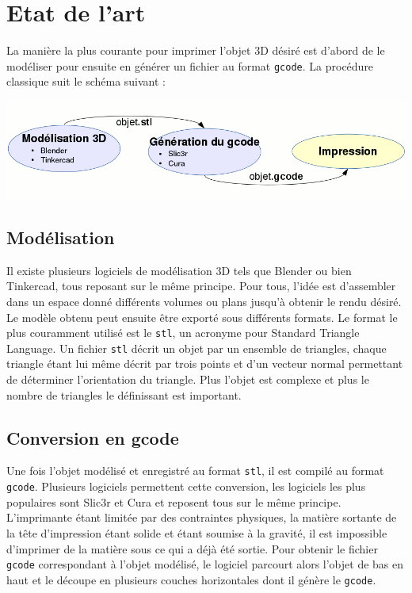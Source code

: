 \documentclass[11pt, titlepage]{article}
\begin{document}
\newpage
\section{Etat de l'art}
La manière la plus courante pour imprimer l'objet 3D désiré est d'abord de le modéliser pour ensuite en générer un fichier au format \verb&gcode&.
La procédure classique suit le schéma suivant :
\begin{center}\includegraphics[scale=0.35]{img/EtatDeLart.png}\end{center}
\subsection{Modélisation}
Il existe plusieurs logiciels de modélisation 3D tels que Blender ou bien Tinkercad, tous reposant sur le même principe. Pour tous, l'idée est d'assembler dans un espace donné différents volumes ou plans jusqu'à obtenir le rendu désiré. Le modèle obtenu peut ensuite être exporté sous différents formats. Le format le plus couramment utilisé est le \verb&stl&, un acronyme pour Standard Triangle Language. Un fichier \verb&stl& décrit un objet par un ensemble de triangles, chaque triangle étant lui même décrit par trois points et d'un vecteur normal permettant de déterminer l'orientation du triangle. Plus l'objet est complexe et plus le nombre de triangles le définissant est important.

\subsection{Conversion en gcode}
Une fois l'objet modélisé et enregistré au format \verb&stl&, il est compilé au format \verb&gcode&.
Plusieurs logiciels permettent cette conversion, les logiciels les plus populaires sont Slic3r et Cura et reposent tous sur le même principe.
L'imprimante étant limitée par des contraintes physiques, la matière sortante de la tête d'impression étant solide et étant soumise à la gravité, il est impossible d'imprimer de la matière sous ce qui a déjà été sortie.
Pour obtenir le fichier \verb&gcode& correspondant à l'objet modélisé, le logiciel parcourt alors l'objet de bas en haut et le découpe en plusieurs couches horizontales dont il génère le \verb&gcode&.
\end{document}
